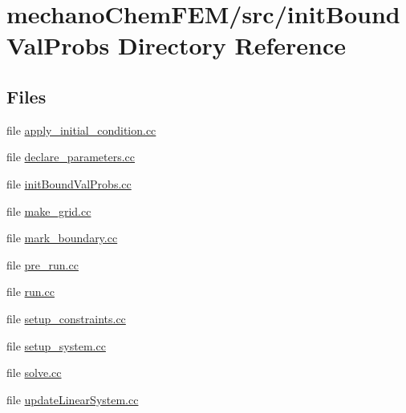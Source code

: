 \section{mechano\-Chem\-F\-E\-M/src/init\-Bound\-Val\-Probs Directory Reference}
\label{dir_0492cce411d358cb2973b5739a19c688}
\subsection*{Files}
\begin{DoxyCompactItemize}
\item 
file \hyperlink{apply__initial__condition_8cc}{apply\-\_\-initial\-\_\-condition.\-cc}
\item 
file \hyperlink{init_bound_val_probs_2declare__parameters_8cc}{declare\-\_\-parameters.\-cc}
\item 
file \hyperlink{init_bound_val_probs_8cc}{init\-Bound\-Val\-Probs.\-cc}
\item 
file \hyperlink{make__grid_8cc}{make\-\_\-grid.\-cc}
\item 
file \hyperlink{mark__boundary_8cc}{mark\-\_\-boundary.\-cc}
\item 
file \hyperlink{pre__run_8cc}{pre\-\_\-run.\-cc}
\item 
file \hyperlink{run_8cc}{run.\-cc}
\item 
file \hyperlink{setup__constraints_8cc}{setup\-\_\-constraints.\-cc}
\item 
file \hyperlink{setup__system_8cc}{setup\-\_\-system.\-cc}
\item 
file \hyperlink{solve_8cc}{solve.\-cc}
\item 
file \hyperlink{update_linear_system_8cc}{update\-Linear\-System.\-cc}
\end{DoxyCompactItemize}
